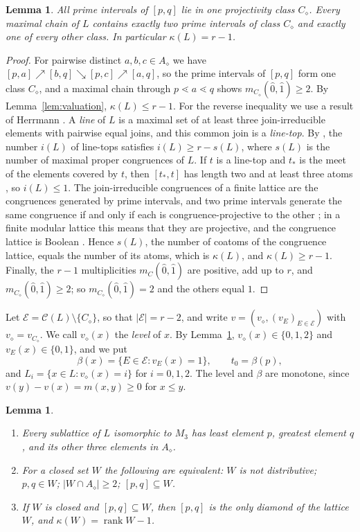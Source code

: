 \documentclass{amsart}
\newtheorem{lemma}[theorem]{Lemma}
\theoremstyle{definition}
\DeclareMathOperator{\rk}{rank}
\newcommand{\cC}{\mathcal C}
\newcommand{\cE}{\mathcal E}
\newcommand{\dm}{\diamond}
\begin{document}
\begin{lemma}\label{lem:onediamond}
	All prime intervals of $[p,q]$ lie in one projectivity class $C_\dm$. Every maximal chain of $L$ contains exactly two prime intervals of class $C_\dm$ and exactly one of every other class. In particular $\kappa(L)=r-1$.
\end{lemma}

\begin{proof}
	For pairwise distinct $a,b,c\in A_\dm$ we have $[p,a]\nearrow[b,q]\searrow[p,c]\nearrow[a,q]$, so the prime intervals of $[p,q]$ form one class $C_\dm$, and a maximal chain through $p\lessdot a\lessdot q$ shows $m_{C_\dm}(\hat0,\hat1)\ge2$. By Lemma~\ref{lem:valuation}, $\kappa(L)\le r-1$. For the reverse inequality we use a result of Herrmann \cite{He}. A \emph{line} of $L$ is a maximal set of at least three join-irreducible elements with pairwise equal joins, and this common join is a \emph{line-top}. By \cite[Corollary 1.2]{He}, the number $i(L)$ of line-tops satisfies $i(L)\ge r-s(L)$, where $s(L)$ is the number of maximal proper congruences of $L$. If $t$ is a line-top and $t_*$ is the meet of the elements covered by $t$, then $[t_*,t]$ has length two and at least three atoms \cite[Section 2, assertion (2)]{He}, so $i(L)\le1$. The join-irreducible congruences of a finite lattice are the congruences generated by prime intervals, and two prime intervals generate the same congruence if and only if each is congruence-projective to the other \cite[Lemma 238]{G}; in a finite modular lattice this means that they are projective, and the congruence lattice is Boolean \cite[Section V.1.5]{G}. Hence $s(L)$, the number of coatoms of the congruence lattice, equals the number of its atoms, which is $\kappa(L)$, and $\kappa(L)\ge r-1$. Finally, the $r-1$ multiplicities $m_C(\hat0,\hat1)$ are positive, add up to $r$, and $m_{C_\dm}(\hat0,\hat1)\ge2$; so $m_{C_\dm}(\hat0,\hat1)=2$ and the others equal $1$.
\end{proof}

Let $\cE=\cC(L)\setminus\{C_\dm\}$, so that $|\cE|=r-2$, and write $v=(v_\dm,(v_E)_{E\in\cE})$ with $v_\dm=v_{C_\dm}$. We call $v_\dm(x)$ the \emph{level} of $x$. By Lemma~\ref{lem:onediamond}, $v_\dm(x)\in\{0,1,2\}$ and $v_E(x)\in\{0,1\}$, and we put
\[
\beta(x)=\{E\in\cE:v_E(x)=1\},\qquad t_0=\beta(p),
\]
and $L_i=\{x\in L:v_\dm(x)=i\}$ for $i=0,1,2$. The level and $\beta$ are monotone, since $v(y)-v(x)=m(x,y)\ge0$ for $x\le y$.

\begin{lemma}\label{lem:M3}
	\begin{enumerate}
		\item[(a)] Every sublattice of $L$ isomorphic to $M_3$ has least element $p$, greatest element $q$, and its other three elements in $A_\dm$.
		\item[(b)] For a closed set $W$ the following are equivalent: $W$ is not distributive; $p,q\in W$; $|W\cap A_\dm|\ge2$; $[p,q]\subseteq W$.
		\item[(c)] If $W$ is closed and $[p,q]\subseteq W$, then $[p,q]$ is the only diamond of the lattice $W$, and $\kappa(W)=\rk W-1$.
	\end{enumerate}
\end{lemma}
\end{document}

